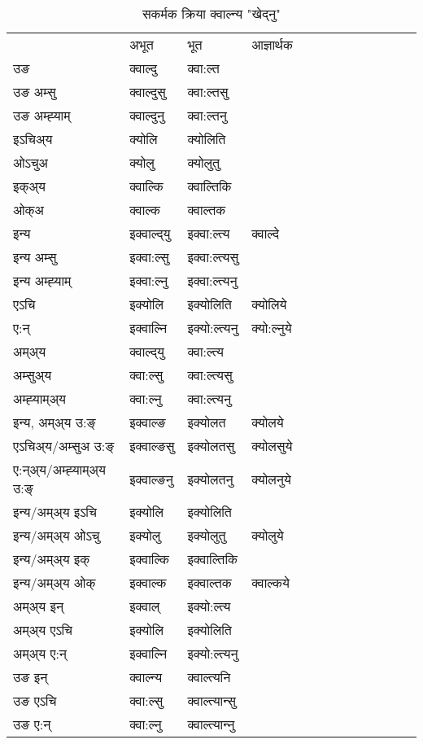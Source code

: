 \begin{table}[H]
\centering
\caption{\label{olt.vt} सकर्मक क्रिया  क्‍वाल्न्य  "खेद्‍नु"  }
\begin{tabular}{l|l|l|l|l|l|l|l|l|l|l|l|l}  \toprule
&अभूत & भूत & आज्ञार्थक \\ 
उङ &क्‍वाल्दु &क्‍वा:ल्त \\ 
उङ अम्सु&क्‍वाल्दुसु &क्‍वा:ल्तसु \\ 
उङ अम्ह्‍याम्&क्‍वाल्दुनु &क्‍वा:ल्तनु \\ 
इऽचिअ्य &क्योलि &क्योलिति   \\ 
ओऽचुअ        &क्योलु &क्योलुतु   \\ 
इक्अ्य&क्‍वाल्कि &क्‍वाल्तिकि   \\ 
ओक्अ &क्‍वाल्क &क्‍वाल्तक   \\ 
इन्य & इक्‍वाल्द्‌यु  & इक्‍वा:ल्त्य &क्‍वाल्दे  \\ 
इन्य अम्सु& इक्‍वा:ल्सु  & इक्‍वा:ल्त्यसु   \\ 
इन्य अम्ह्‍याम्& इक्‍वा:ल्नु  & इक्‍वा:ल्त्यनु   \\ 
एऽचि & इक्योलि & इक्योलिति &क्योलिये    \\ 
ए:न् & इक्‍वाल्नि  & इक्यो:ल्त्यनु &क्यो:ल्नुये  \\ 
अम्अ्य & क्‍वाल्द्‌यु  & क्‍वा:ल्त्य  \\ 
अम्सुअ्य & क्‍वा:ल्सु & क्‍वा:ल्त्यसु  \\ 
अम्ह्‍याम्अ्य & क्‍वा:ल्नु  & क्‍वा:ल्त्यनु \\ 
\midrule
इन्य, अम्अ्य उ:ङ्‌ &इक्‍वाल्ङ &इक्योलत &क्योलये \\ 
एऽचिअ्य/अम्सुअ उ:ङ्‌ &इक्‍वाल्ङसु &इक्योलतसु &क्योलसुये \\ 
ए:न्अ्य/अम्ह्‍याम्अ्य उ:ङ्‌ &इक्‍वाल्ङनु &इक्योलतनु &क्योलनुये \\ 
इन्य/अम्अ्य इऽचि &इक्योलि &इक्योलिति    \\ 
इन्य/अम्अ्य ओऽचु &इक्योलु &इक्योलुतु  &क्योलुये  \\ 
इन्य/अम्अ्य इक् &इक्‍वाल्कि &इक्‍वाल्तिकि   \\ 
इन्य/अम्अ्य ओक् &इक्‍वाल्क &इक्‍वाल्तक  &क्‍वाल्कये  \\ 
अम्अ्य इन् & इक्‍वाल् & इक्यो:ल्त्य   \\ 
अम्अ्य एऽचि & इक्योलि & इक्योलिति    \\ 
अम्अ्य ए:न् & इक्‍वाल्नि  & इक्यो:ल्त्यनु  \\ 
\midrule
उङ इन् & क्‍वाल्न्य  & क्‍वाल्त्यनि  \\ 
उङ एऽचि & क्‍वा:ल्सु  & क्‍वाल्त्यान्सु   \\ 
उङ ए:न्& क्‍वा:ल्नु  & क्‍वाल्त्यान्‍नु   \\ 
\bottomrule
\end{tabular}
\end{table}



